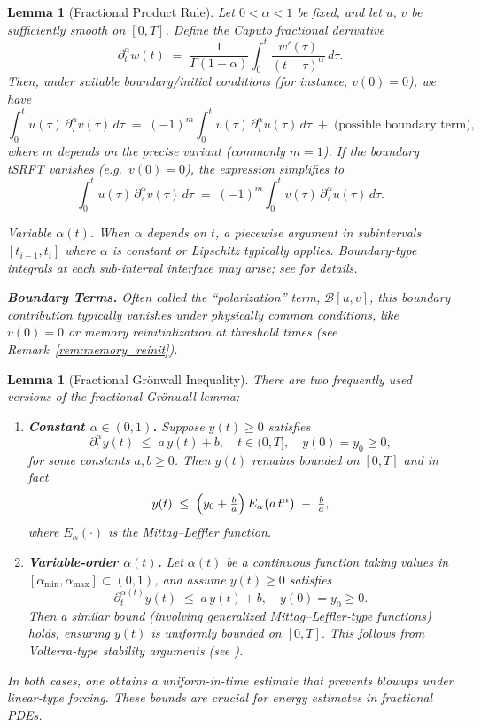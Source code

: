 \documentclass[12pt]{article}
\newtheorem{lemma}[theorem]{Lemma}
\begin{document}
\begin{lemma}[Fractional Product Rule]
\label{lem:frac_product_rule}
Let $0 < \alpha < 1$ be fixed, and let $u,\,v$ be sufficiently smooth 
on $[0,T]$. Define the Caputo fractional derivative
\[
\partial_t^\alpha w(t)
\;=\;
\frac{1}{\Gamma(1-\alpha)}
\int_{0}^{t}
  \frac{w'(\tau)}{(t-\tau)^\alpha}\,d\tau.
\]
Then, under suitable boundary/initial conditions (for instance, $v(0)=0$), we have
\[
\int_{0}^{t} 
  u(\tau)\,\partial_\tau^\alpha v(\tau)\,d\tau
\;=\;
(-1)^m
\int_{0}^{t} 
  v(\tau)\,\partial_\tau^\alpha u(\tau)\,d\tau
\;+\;\text{(possible boundary term)},
\]
where $m$ depends on the precise variant (commonly $m=1$). 
If the boundary tSRFT vanishes (e.g.\ $v(0)=0$), the expression 
simplifies to
\[
\int_{0}^{t} u(\tau)\,\partial_\tau^\alpha v(\tau)\,d\tau
\;=\;
(-1)^m\!\int_{0}^{t} v(\tau)\,\partial_\tau^\alpha u(\tau)\,d\tau.
\]

\smallskip
\noindent
\emph{Variable \(\alpha(t)\).}
When $\alpha$ depends on $t$, a piecewise argument in subintervals 
$[t_{i-1}, t_i]$ where $\alpha$ is constant or Lipschitz typically applies. 
Boundary-type integrals at each sub-interval interface may arise; see 
\cite{Sun2019} for details.

\smallskip
\noindent
\textbf{Boundary Terms.}
Often called the “polarization” term, $\mathcal{B}[u,v]$, this boundary 
contribution typically vanishes under physically common conditions, like 
$v(0)=0$ or memory reinitialization at threshold times 
(see Remark~\ref{rem:memory_reinit}).
\end{lemma}

\begin{lemma}[Fractional Grönwall Inequality]
\label{lem:frac_gronwall}
There are two frequently used versions of the fractional Grönwall lemma:

\begin{enumerate}
\item[\textup{(a)}] \textbf{Constant \(\alpha\in (0,1)\).}
  Suppose \(y(t)\ge 0\) satisfies
  \[
    \partial_t^\alpha y(t)\;\le\; a\,y(t) + b,\quad t\in(0,T],\quad y(0)=y_0\ge0,
  \]
  for some constants \(a,b\ge0\). Then \(y(t)\) remains bounded on $[0,T]$ and in fact
  \[
    y(t)
    \;\le\;
    \Bigl(y_0 + \tfrac{b}{a}\Bigr)\,E_\alpha\bigl(a\,t^\alpha\bigr)
    \;-\;\tfrac{b}{a},
  \]
  where $E_\alpha(\cdot)$ is the Mittag–Leffler function.

\item[\textup{(b)}] \textbf{Variable‐order \(\alpha(t)\).}
  Let $\alpha(t)$ be a continuous function taking values in $[\alpha_{\min},\alpha_{\max}]\subset(0,1)$,
  and assume $y(t)\ge0$ satisfies
  \[
    \partial_t^{\alpha(t)}y(t) \;\le\; a\,y(t) + b,\quad y(0)=y_0\ge0.
  \]
  Then a similar bound (involving generalized Mittag–Leffler‐type functions) holds, ensuring
  $y(t)$ is uniformly bounded on $[0,T]$.  This follows from Volterra‐type stability arguments
  (see \cite{Sun2019,Ye2007}).
\end{enumerate}

In both cases, one obtains a uniform-in-time estimate that prevents blowups under linear‐type
forcing.  These bounds are crucial for energy estimates in fractional PDEs.
\end{lemma}
\end{document}
